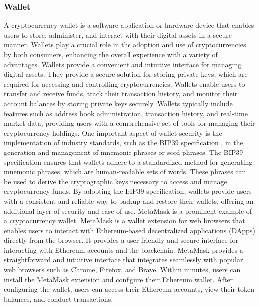 \documentclass[../../Main.tex]{subfiles}
\begin{document}
\subsubsection{Wallet}
\label{section:2.1.3.2}
A cryptocurrency wallet is a software application or hardware device that enables users to store, administer, and interact with their digital assets in a secure manner. Wallets play a crucial role in the adoption and use of cryptocurrencies by both consumers, enhancing the overall experience with a variety of advantages. Wallets provide a convenient and intuitive interface for managing digital assets. They provide a secure solution for storing private keys, which are required for accessing and controlling cryptocurrencies. Wallets enable users to transfer and receive funds, track their transaction history, and monitor their account balances by storing private keys securely. Wallets typically include features such as address book administration, transaction history, and real-time market data, providing users with a comprehensive set of tools for managing their cryptocurrency holdings.
One important aspect of wallet security is the implementation of industry standards, such as the BIP39 specification \cite{bip39}, in the generation and management of mnemonic phrases or seed phrases. The BIP39 specification ensures that wallets adhere to a standardized method for generating mnemonic phrases, which are human-readable sets of words. These phrases can be used to derive the cryptographic keys necessary to access and manage cryptocurrency funds. By adopting the BIP39 specification, wallets provide users with a consistent and reliable way to backup and restore their wallets, offering an additional layer of security and ease of use.
MetaMask \cite{metamask} is a prominent example of a cryptocurrency wallet. MetaMask is a wallet extension for web browsers that enables users to interact with Ethereum-based decentralized applications (DApps) directly from the browser. It provides a user-friendly and secure interface for interacting with Ethereum accounts and the blockchain. MetaMask provides a straightforward and intuitive interface that integrates seamlessly with popular web browsers such as Chrome, Firefox, and Brave. Within minutes, users can install the MetaMask extension and configure their Ethereum wallet. After configuring the wallet, users can access their Ethereum accounts, view their token balances, and conduct transactions.
\end{document}
